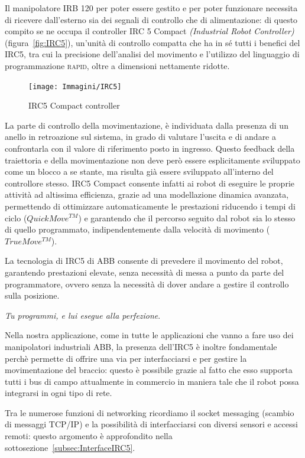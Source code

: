 Il manipolatore IRB 120 per poter essere gestito e per poter funzionare necessita di ricevere dall'esterno sia dei segnali di controllo che di alimentazione: di questo compito se ne occupa il controller IRC 5 Compact \emph{(Industrial Robot Controller)} (figura~\vref{fig:IRC5}), un'unità di controllo compatta che ha in sé tutti i benefici del IRC5, tra cui la precisione dell’analisi del movimento e l’utilizzo del
linguaggio di programmazione \textsc{rapid}, oltre a dimensioni nettamente ridotte.
\begin{figure}
	\centering
	\texttt{[image: Immagini/IRC5]}
	\caption{IRC5 Compact controller}
	\label{fig:IRC5}
\end{figure}

La parte di controllo della movimentazione, è individuata dalla presenza di un anello in retroazione sul sistema, in grado di valutare l'uscita e di andare a confrontarla con il valore di riferimento posto in ingresso. Questo feedback della traiettoria e della movimentazione non deve però essere esplicitamente sviluppato come un blocco a se stante, ma risulta già essere sviluppato all'interno del controllore stesso.
IRC5 Compact consente infatti ai robot di eseguire le proprie attività ad altissima efficienza, grazie ad una modellazione dinamica avanzata, permettendo di ottimizzare automaticamente le prestazioni riducendo i tempi di ciclo ($QuickMove^{TM}$) e garantendo che il percorso seguito dal robot sia lo stesso di quello programmato, indipendentemente dalla velocità di movimento ($TrueMove^{TM}$).

La tecnologia di IRC5 di ABB consente di prevedere il movimento del robot, garantendo prestazioni elevate, senza necessità di messa a punto da parte del programmatore, ovvero senza la necessità di dover andare a gestire il controllo sulla posizione.

\emph{Tu programmi, e lui esegue alla perfezione}.

Nella nostra applicazione, come in tutte le applicazioni che vanno a fare uso dei manipolatori industriali ABB, la presenza dell'IRC5 è inoltre fondamentale perchè permette di offrire una via per interfacciarsi e per gestire la movimentazione del braccio: questo è possibile grazie al fatto che esso supporta tutti i bus di campo attualmente in commercio in maniera tale che il robot possa integrarsi in ogni tipo di rete. 



Tra le numerose funzioni di networking ricordiamo il socket messaging (scambio di messaggi TCP/IP) e la possibilità di interfacciarsi con diversi sensori e accessi remoti: questo argomento è approfondito nella sottosezione~\vref{subsec:InterfaceIRC5}.

